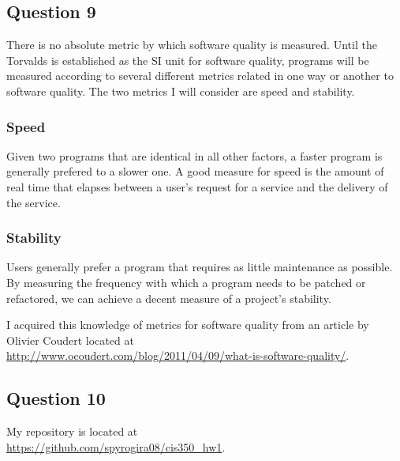 \documentclass{article}
\begin{document}
\subsection*{Question 9}
There is no absolute metric by which software quality is measured.  Until the Torvalds is established as the SI unit for software quality, programs will be measured according to several different metrics related in one way or another to software quality.  The two metrics I will consider are speed and stability.
\subsubsection*{Speed}
Given two programs that are identical in all other factors, a faster program is generally prefered to a slower one.  A good measure for speed is the amount of real time that elapses between a user's request for a service and the delivery of the service.
\subsubsection*{Stability}
Users generally prefer a program that requires as little maintenance as possible.  By measuring the frequency with which a program needs to be patched or refactored, we can achieve a decent measure of a project's stability.

I acquired this knowledge of metrics for software quality from an article by Olivier Coudert located at \\
\url{http://www.ocoudert.com/blog/2011/04/09/what-is-software-quality/}.

\subsection*{Question 10}
My repository is located at \\
\url{https://github.com/spyrogira08/cis350_hw1}.
\end{document}
